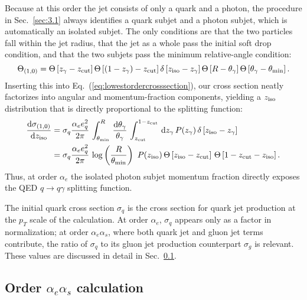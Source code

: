 \documentclass[a4paper,11pt]{article}
\DeclareRobustCommand{\Sec}[1]{Sec.~\ref{#1}}
\DeclareRobustCommand{\Eq}[1]{Eq.~(\ref{#1})}
\newcommand{\ziso}{z_{\rm iso}}
\begin{document}
Because at this order the jet consists of only a quark and a photon, the procedure in \Sec{sec:3.1} always identifies a quark subjet and a photon subjet, which is automatically an isolated subjet.
%
The only conditions are that the two particles fall within the jet radius, that the jet as a whole pass the initial soft drop condition, and that the two subjets pass the minimum relative-angle condition:
%
\begin{equation}
    \Theta_{(1,0)} = 
    \Theta\left[z_{\gamma} - z_{\text{cut}}\right]
    \Theta\left[\left(1 - z_{\gamma}\right) - z_{\text{cut}}\right]
    \delta\left[\ziso - z_{\gamma}\right]
    \Theta\left[R - \theta_{\gamma}\right]
    \Theta\left[\theta_{\gamma} - \theta_{\text{min}}\right].
\end{equation}
Inserting this into \Eq{eq:lowestordercrosssection}, our cross section neatly factorizes into angular and momentum-fraction components, yielding a $\ziso$ distribution that is directly proportional to the splitting function:
\begin{equation}
\begin{split}
\label{eq:lowestorderfinalanswer}
    \frac{\text{d} \sigma_{(1,0)}}{\text{d} \ziso} &=
    \sigma_q \frac{\alpha_e e_q^2}{2 \pi} \, \int_{\theta_{\text{min}}}^{R} \, \frac{\text{d} \theta_{\gamma}}{\theta_{\gamma}} \, \int_{z_{\text{cut}}}^{1 - z_{\text{cut}}}\, \text{d} z_{\gamma} \, P(z_{\gamma}) \,
        \delta\left[\ziso - z_{\gamma}\right]\\
    &= \sigma_q \frac{\alpha_e e_q^2}{2 \pi} \, \log\left(\frac{R}{\theta_{\text{min}}}\right) \,\,P(\ziso) \,\Theta\left[\ziso - z_{\text{cut}}\right]\,\Theta\left[1 - z_{\text{cut}} - \ziso \right].
\end{split}
\end{equation}
%
Thus, at order $\alpha_e$ the isolated photon subjet momentum fraction directly exposes the QED $q \to q \gamma$ splitting function.

The initial quark cross section $\sigma_q$ is the cross section for quark jet production at the $p_T$ scale of the calculation. At order $\alpha_e$, $\sigma_q$ appears only as a factor in normalization; at order $\alpha_e \alpha_s$, where both quark jet and gluon jet terms contribute, the ratio of $\sigma_q$ to its gluon jet production counterpart $\sigma_g$ is relevant. These values are discussed in detail in \Sec{sec:3.3}.

\subsection{Order $\alpha_e \alpha_s$ calculation}
\label{sec:3.3}
\end{document}
